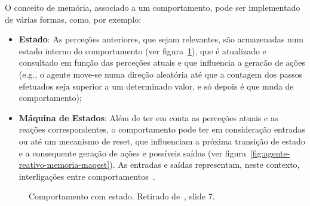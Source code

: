 O conceito de memória, associado a um comportamento, pode ser implementado de várias formas, como, por exemplo:

\begin{itemize}
    \item \textbf{Estado}: As perceções anteriores, que sejam relevantes, são armazenadas num estado interno do comportamento (ver figura~\ref{fig:agente-reativo-memoria-estado}), que é atualizado e consultado em função das perceções atuais e que influencia a geracão de ações (e.g., o agente move-se numa direção aleatória até que a contagem dos passos efetuados seja superior a um determinado valor, e só depois é que muda de comportamento);
    \item \textbf{Máquina de Estados}: Além de ter em conta as perceções atuais e as reações correspondentes, o comportamento pode ter em consideração entradas ou até um mecanismo de reset, que influenciam a próxima transição de estado e a consequente geração de ações e possíveis saídas (ver figura~\ref{fig:agente-reativo-memoria-maqest}).
    As entradas e saídas representam, neste contexto, interligações entre comportamentos~\cite{isel:iasa:slides:arq-agentes-reativos-parte-3}.
\end{itemize}

\begin{figure}[H]
    \begin{center}
    \end{center}
    \caption{Comportamento com estado.
    Retirado de~\cite{isel:iasa:slides:arq-agentes-reativos-parte-3}, slide 7.}\label{fig:agente-reativo-memoria-estado}
\end{figure}

